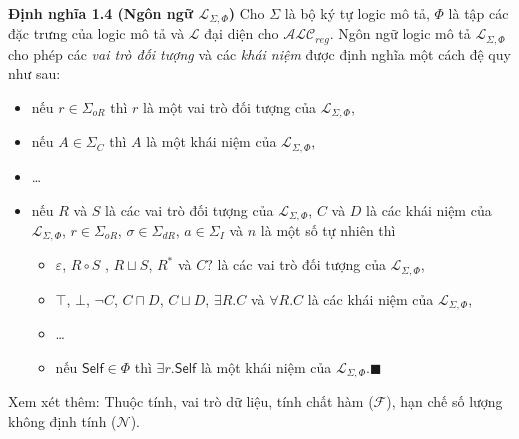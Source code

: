 \documentclass[notheorems,xcolor=dvipsnames]{beamer}
\newcommand{\mL}		{\mathcal{L}}
\newcommand{\mN}		{\mathcal{N}}
\newcommand{\mF}		{\mathcal{F}}
\newcommand{\SigmaI}	{\Sigma_I}
\newcommand{\SigmaC}	{\Sigma_C}
\newcommand{\SigmaOR}	{\Sigma_{oR}}
\newcommand{\SigmaDR}	{\Sigma_{dR}}
\newcommand{\Self}		{\mathsf{Self}}
\newcommand{\mLSP}		{\mL_{\Sigma,\Phi}}
\newcommand{\ALCreg}	{$\mathcal{ALC}_{reg}$\xspace}
\newcommand{\myend}		{\mbox{}\hfill\mbox{{\tiny$\!\blacksquare$}}}
\newcommand{\mand}		{\sqcap}
\newcommand{\mor}		{\sqcup}
\newcommand{\V}			{\forall}
\newcommand{\E}			{\exists}
\begin{document}
\begin{frame}\frametitle{}
	\vspace{-1.0ex}
	\begin{block}{\bf Định nghĩa 1.4 (Ngôn ngữ $\mLSP$)}
	\label{def:LSPLanguage}
	\vspace{-1.0ex}
	Cho $\Sigma$ là bộ ký tự logic mô tả, $\Phi$ là tập các đặc trưng của logic mô tả và $\mL$ đại diện cho \ALCreg. Ngôn ngữ logic mô tả $\mLSP$ cho phép các {\em vai trò đối tượng} và các {\em khái niệm} được định nghĩa một cách đệ quy như sau:
	\begin{itemize}
		\item nếu $r \in \SigmaOR$ thì $r$ là một vai trò đối tượng của $\mLSP$,
		\item nếu $A \in \SigmaC$ thì $A$ là một khái niệm của $\mLSP$,
		\item \ldots
		\item nếu $R$ và $S$ là các vai trò đối tượng của $\mLSP$, $C$ và $D$ là các khái niệm của $\mLSP$, $r \in \SigmaOR$, $\sigma \in \SigmaDR$, $a \in \SigmaI$ và $n$ là một số tự nhiên thì
		\begin{itemize}
			\item $\varepsilon$, $R \circ S$ , $R \sqcup S$, $R^*$ và $C?$ là các vai trò đối tượng của $\mLSP$,
			\item $\top$, $\bot$, $\neg C$, $C \mand D$, $C \mor D$, $\E R.C$ và $\V R.C$ là các khái niệm của $\mLSP$,
			\item \ldots
			\item nếu $\Self \in \Phi$ thì $\E r.\Self$ là một khái niệm của $\mLSP$.\myend
		\end{itemize}
	\end{itemize}
	\end{block}
	Xem xét thêm: Thuộc tính, vai trò dữ liệu, tính chất hàm ($\mF$), hạn chế số lượng không định tính ($\mN$).
\end{frame}
\end{document}
